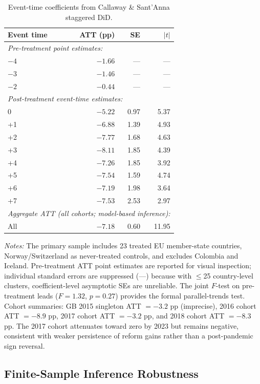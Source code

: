 \documentclass[11pt]{article}
\newcommand{\tabnoteblock}[1]{%
    \par\vspace{0.45em}%
    \begin{minipage}{0.98\linewidth}
    \footnotesize\raggedright #1
    \end{minipage}\par
}
\newcommand{\tabnotes}[1]{\tabnoteblock{\textit{Notes:} #1}}
\begin{document}
\begin{table}[H]
\centering
\caption{Event-time coefficients from Callaway \& Sant'Anna staggered DiD.}
\label{tab:event_study}
\begin{tabular}{lrrr}
\toprule
\textbf{Event time} & \textbf{ATT (pp)} & \textbf{SE} & \textbf{$|t|$} \\
\midrule
\multicolumn{4}{l}{\textit{Pre-treatment point estimates:}} \\
$-4$ & $-1.66$ & --- & --- \\
$-3$ & $-1.46$ & --- & --- \\
$-2$ & $-0.44$ & --- & --- \\
\midrule
\multicolumn{4}{l}{\textit{Post-treatment event-time estimates:}} \\
0 & $-5.22$ & 0.97 & 5.37 \\
+1 & $-6.88$ & 1.39 & 4.93 \\
+2 & $-7.77$ & 1.68 & 4.63 \\
+3 & $-8.11$ & 1.85 & 4.39 \\
+4 & $-7.26$ & 1.85 & 3.92 \\
+5 & $-7.54$ & 1.59 & 4.74 \\
+6 & $-7.19$ & 1.98 & 3.64 \\
+7 & $-7.53$ & 2.53 & 2.97 \\
\midrule
\multicolumn{4}{l}{\textit{Aggregate ATT (all cohorts; model-based inference):}} \\
All & $-7.18$ & 0.60 & 11.95 \\
\bottomrule
\end{tabular}

\tabnotes{The primary sample includes 23 treated EU member-state countries, Norway/Switzerland as never-treated controls, and excludes Colombia and Iceland. Pre-treatment ATT point estimates are reported for visual inspection; individual standard errors are suppressed (---) because with $\leq$25 country-level clusters, coefficient-level asymptotic SEs are unreliable. The joint $F$-test on pre-treatment leads ($F = 1.32$, $p = 0.27$) provides the formal parallel-trends test. Cohort summaries: GB 2015 singleton ATT $= -3.2$ pp (imprecise), 2016 cohort ATT $= -8.9$ pp, 2017 cohort ATT $= -3.2$ pp, and 2018 cohort ATT $= -8.3$ pp. The 2017 cohort attenuates toward zero by 2023 but remains negative, consistent with weaker persistence of reform gains rather than a post-pandemic sign reversal.
}
\end{table}

\subsection{Finite-Sample Inference Robustness}
\end{document}

